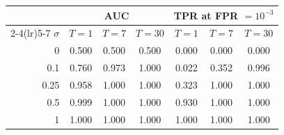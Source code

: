 \begin{tabular}{rcccccc}
\toprule
 & \multicolumn{3}{c}{AUC} & \multicolumn{3}{c}{TPR at FPR $=10^{-3}$}\\
\cmidrule(lr){2-4}\cmidrule(lr){5-7}
$\sigma$ & $T{=}1$ & $T{=}7$ & $T{=}30$ & $T{=}1$ & $T{=}7$ & $T{=}30$\\
\midrule
0 & 0.500 & 0.500 & 0.500 & 0.000 & 0.000 & 0.000\\
0.1 & 0.760 & 0.973 & 1.000 & 0.022 & 0.352 & 0.996\\
0.25 & 0.958 & 1.000 & 1.000 & 0.323 & 1.000 & 1.000\\
0.5 & 0.999 & 1.000 & 1.000 & 0.930 & 1.000 & 1.000\\
1 & 1.000 & 1.000 & 1.000 & 1.000 & 1.000 & 1.000\\
\bottomrule
\end{tabular}
